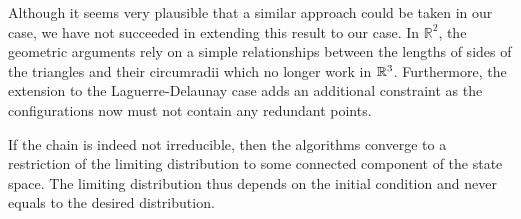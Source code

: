 Although it seems very plausible that a similar approach could be taken in our case, we have not succeeded in extending this result to our case. In $\mathbb R^2$, the geometric arguments rely on a simple relationships between the lengths of sides of the triangles and their circumradii which no longer work in ${\mathbb R^3}$. Furthermore, the extension to the Laguerre-Delaunay case adds an additional constraint as the configurations now must not contain any redundant points.

If the chain is indeed not irreducible, then the algorithms converge to a restriction of the limiting distribution to some connected component of the state space. The limiting distribution thus depends on the initial condition and never equals to the desired distribution.
